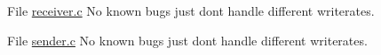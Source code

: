 
\begin{DoxyRefList}
\item[File \mbox{\hyperlink{receiver_8c}{receiver.c}} ]\label{bug__bug000001}%
%
No known bugs just don\textquotesingle{}t handle different writerates.  
\item[File \mbox{\hyperlink{sender_8c}{sender.c}} ]\label{bug__bug000002}%
%
No known bugs just don\textquotesingle{}t handle different writerates. 
\end{DoxyRefList}
